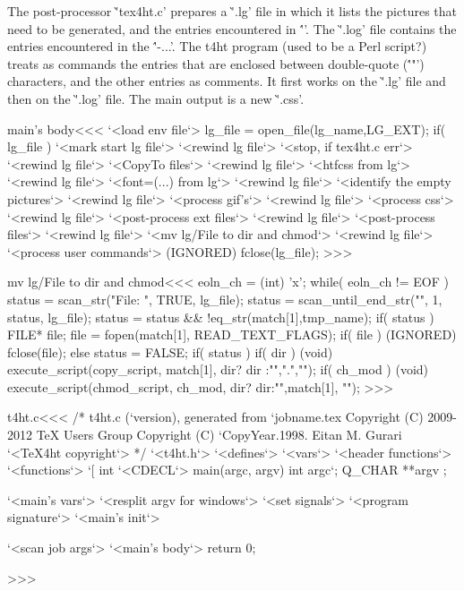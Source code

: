 The post-processor \`'tex4ht.c' prepares a \`'.lg' file in which it
lists the pictures that need to be generated, and the entries
encountered in \'''.  The \`'.log' file contains the entries
encountered in the \''\Needs-{...}'.  The t4ht program (used to be a
Perl script?) treats as commands the entries that are enclosed between
double-quote (\''"') characters, and the other entries as comments. It
first works on the \`'.lg' file and then on the \`'.log' file.
The main output is a new \`'.css'.


\<main's body\><<<
`<load env file`>
lg_file = open_file(lg_name,LG_EXT);
if( lg_file ) {
   `<mark start lg file`>
   `<rewind lg file`>  `<stop, if tex4ht.c err`>
   `<rewind lg file`>  `<CopyTo files`>
   `<rewind lg file`>  `<htfcss from lg`>
   `<rewind lg file`>  `<font=(...) from lg`>
   `<rewind lg file`>  `<identify the empty pictures`>
   `<rewind lg file`>  `<process gif's`>
   `<rewind lg file`>  `<process css`>
   `<rewind lg file`>  `<post-process ext files`>
   `<rewind lg file`>  `<post-process files`>
   `<rewind lg file`>  `<mv lg/File to dir and chmod`>
   `<rewind lg file`>  `<process user commands`>
   (IGNORED) fclose(lg_file);    
}
>>>

\<mv lg/File to dir and chmod\><<<
eoln_ch = (int) 'x';
while( eoln_ch != EOF ) {              
   status = scan_str("File: ", TRUE, lg_file);
   status = scan_until_end_str("", 1, status, lg_file);
   status = status && !eq_str(match[1],tmp_name);
   if( status ){
                    FILE* file;
     file = fopen(match[1], READ_TEXT_FLAGS);
     if( file ){
        (IGNORED) fclose(file);
     } else { status = FALSE; }
   }
   if( status ){
      if( dir ){                          
         (void) execute_script(copy_script, match[1], 
                               dir? dir :"",".","");
      }
      if( ch_mod ){
         (void) execute_script(chmod_script, ch_mod,
                               dir? dir:"",match[1], "");
      }
}  }
>>>

% 



\<t4ht.c\><<<
/* t4ht.c (`version), generated from `jobname.tex
   Copyright (C) 2009-2012 TeX Users Group
   Copyright (C) `CopyYear.1998. Eitan M. Gurari
`<TeX4ht copyright`> 
*/
`<t4ht.h`>
`<defines`>
`<vars`>
`<header functions`>
`<functions`>
`[
int `<CDECL`> main(argc, argv)
       int  argc`;  
       Q_CHAR **argv
;{ `<main's vars`> 
   `<resplit argv for windows`>
   `<set signals`>
   `<program signature`>
   `<main's init`> 

  `<scan job args`>
   `<main's body`>  
   return 0;
}
>>>


